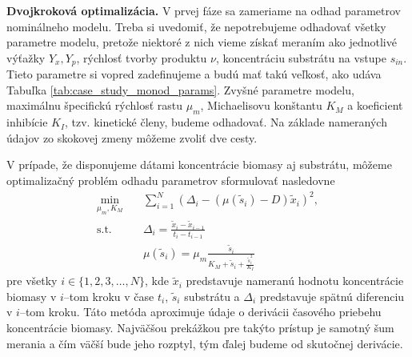 \textbf{Dvojkroková optimalizácia.}
V prvej fáze sa zameriame na odhad parametrov nominálneho modelu. Treba si uvedomiť, že nepotrebujeme odhadovať všetky parametre modelu, pretože niektoré z nich vieme získať meraním ako jednotlivé výťažky $ Y_{x}, Y_{p} $, rýchlosť tvorby produktu $ \nu $, koncentráciu substrátu na vstupe $ s_{in} $. Tieto parametre si vopred zadefinujeme a budú mať takú veľkosť, ako udáva Tabuľka \ref{tab:case_study_monod_params}. Zvyšné parametre modelu, maximálnu špecifickú rýchlosť rastu $ \mu_{m} $, Michaelisovu konštantu $ K_{M} $ a koeficient inhibície $ K_{I} $, tzv. kinetické členy, budeme odhadovať. Na základe nameraných údajov zo skokovej zmeny môžeme zvoliť dve cesty.

V prípade, že disponujeme dátami koncentrácie biomasy aj substrátu, môžeme optimalizačný problém odhadu parametrov sformulovať nasledovne
\begin{equation}
\label{eq:twostep_der_app}
	\begin{split}
		\min_{\mu_{m},K_{M}} \quad &\sum_{i=1}^{N} \left(\Delta_{i} - \left(\mu(\tilde{s}_{i}) - D\right)\tilde{x}_{i}\right)^2, \\
		\text{s.t.} \quad &\Delta_{i} = \frac{\tilde{x}_{i} - \tilde{x}_{i-1}}{t_{i} - t_{i-1}} \\
		\quad &\mu(\tilde{s}_{i})=\mu_{m}\frac{\tilde{s}_{i}}{K_{M} + \tilde{s}_{i} + \frac{\tilde{s}_{i}^2}{K_{I}}}
	\end{split}
\end{equation} 
pre všetky $ i \in \lbrace 1,2,3,\dots,N \rbrace $, kde $ \tilde{x}_{i} $ predstavuje nameranú hodnotu koncentrácie biomasy v $ i $--tom kroku v čase $ t_i $, $ \tilde{s}_{i} $ substrátu a $ \Delta_{i} $ predstavuje spätnú diferenciu v $ i $--tom kroku. Táto metóda aproximuje údaje o derivácii časového priebehu koncentrácie biomasy. Najväčšou prekážkou pre takýto prístup je samotný šum merania a čím väčší bude jeho rozptyl, tým ďalej budeme od skutočnej derivácie.

